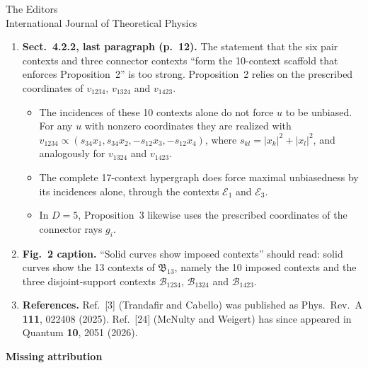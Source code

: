 \documentclass[11pt]{letter}
\begin{document}
\begin{letter}{The Editors\\
International Journal of Theoretical Physics}
\begin{enumerate}[leftmargin=*]
\item \textbf{Sect.~4.2.2, last paragraph (p.~12).}
The statement that the six pair contexts and three connector contexts ``form the 10-context scaffold that enforces Proposition~2'' is too strong.
Proposition~2 relies on the prescribed coordinates of $v_{1234}$, $v_{1324}$ and $v_{1423}$.
\begin{itemize}[leftmargin=*]
\item The incidences of these 10 contexts alone do not force $u$ to be unbiased.
For any $u$ with nonzero coordinates they are realized with $v_{1234}\propto(s_{34}x_1,s_{34}x_2,-s_{12}x_3,-s_{12}x_4)$, where $s_{kl}=|x_k|^2+|x_l|^2$, and analogously for $v_{1324}$ and $v_{1423}$.
\item The complete 17-context hypergraph does force maximal unbiasedness by its incidences alone, through the contexts $\mathcal{E}_1$ and $\mathcal{E}_3$.
\item In $D=5$, Proposition~3 likewise uses the prescribed coordinates of the connector rays $g_i$.
\end{itemize}

\item \textbf{Fig.~2 caption.}
``Solid curves show imposed contexts'' should read: solid curves show the 13 contexts of $\mathfrak{B}_{13}$, namely the 10 imposed contexts and the three disjoint-support contexts $\mathcal{B}_{1234}$, $\mathcal{B}_{1324}$ and $\mathcal{B}_{1423}$.

\item \textbf{References.}
Ref.~[3] (Trandafir and Cabello) was published as Phys.\ Rev.\ A \textbf{111}, 022408 (2025).
Ref.~[24] (McNulty and Weigert) has since appeared in Quantum \textbf{10}, 2051 (2026).
\end{enumerate}

\medskip\noindent\textbf{Missing attribution}


\end{letter}
\end{document}
